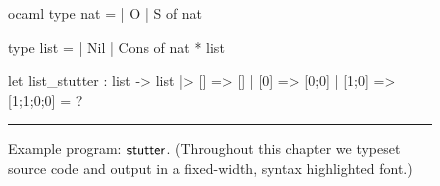 \begin{figure}
  \begin{center}
      \begin{cminted}{ocaml}
type nat =
| O
| S of nat

type list =
| Nil
| Cons of nat * list

let list_stutter : list -> list |>
{ [] => []
| [0] => [0;0]
| [1;0] => [1;1;0;0]
} = ?
      \end{cminted}
  \end{center}
\hrule
\caption[Example \myth{} program: $\mkwd{stutter}$]{%
  Example \myth{} program: $\mkwd{stutter}$.
  (Throughout this chapter we typeset \myth{} source code and output in a fixed-width, syntax highlighted font.)
}
\label{fig:myth-stutter}
\end{figure}
